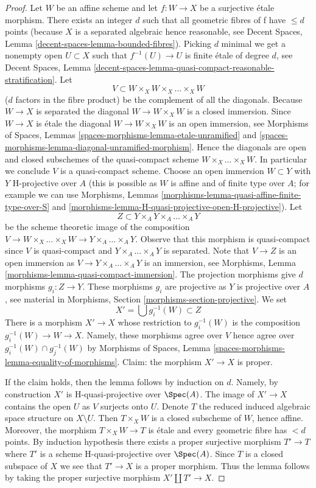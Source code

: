 \begin{proof}
Let $W$ be an affine scheme and let $f : W \to X$ be a surjective
\'etale morphism. There exists an integer $d$ such that all geometric
fibres of f have $\leq d$ points (because $X$ is a separated algebraic
hence reasonable, see
Decent Spaces, Lemma \ref{decent-spaces-lemma-bounded-fibres}).
Picking $d$ minimal we get a nonempty open $U \subset X$ such that
$f^{-1}(U) \to U$ is finite \'etale of degree $d$, see
Decent Spaces, Lemma
\ref{decent-spaces-lemma-quasi-compact-reasonable-stratification}.
Let
$$
V \subset W \times_X W \times_X \ldots \times_X W
$$
($d$ factors in the fibre product) be the complement of all the diagonals.
Because $W \to X$ is separated the diagonal $W \to W \times_X W$ is a
closed immersion. Since $W \to X$ is \'etale the diagonal
$W \to W \times_X W$ is an open immersion, see
Morphisms of Spaces, Lemmas
\ref{spaces-morphisms-lemma-etale-unramified} and
\ref{spaces-morphisms-lemma-diagonal-unramified-morphism}.
Hence the diagonals are open and closed subschemes
of the quasi-compact scheme $W \times_X \ldots \times_X W$.
In particular we conclude $V$ is a quasi-compact scheme.
Choose an open immersion $W \subset Y$ with $Y$ H-projective over
$A$ (this is possible as $W$ is affine and of finite type over $A$;
for example we can use
Morphisms, Lemmas
\ref{morphisms-lemma-quasi-affine-finite-type-over-S} and
\ref{morphisms-lemma-H-quasi-projective-open-H-projective}).
Let
$$
Z \subset Y \times_A Y \times_A \ldots \times_A Y
$$
be the scheme theoretic image of the composition
$V \to W \times_X \ldots \times_X W \to Y \times_A \ldots \times_A Y$.
Observe that this morphism is quasi-compact since $V$ is quasi-compact
and $Y \times_A \ldots \times_A Y$ is separated.
Note that $V \to Z$ is an open immersion as
$V \to Y \times_A \ldots \times_A Y$ is an immersion, see
Morphisms, Lemma \ref{morphisms-lemma-quasi-compact-immersion}.
The projection morphisms give $d$ morphisms $g_i : Z \to Y$.
These morphisms $g_i$ are projective as $Y$ is projective over $A$, see
material in Morphisms, Section \ref{morphisms-section-projective}.
We set
$$
X' = \bigcup g_i^{-1}(W) \subset Z
$$
There is a morphism $X' \to X$ whose restriction to $g_i^{-1}(W)$ is
the composition $g_i^{-1}(W) \to W \to X$.
Namely, these morphisms agree over $V$ hence agree over
$g_i^{-1}(W) \cap g_j^{-1}(W)$ by
Morphisms of Spaces, Lemma \ref{spaces-morphisms-lemma-equality-of-morphisms}.
Claim: the morphism $X' \to X$ is proper.

\medskip\noindent
If the claim holds, then the lemma follows by induction on $d$.
Namely, by construction $X'$ is H-quasi-projective over $\Spec(A)$.
The image of $X' \to X$ contains the open $U$ as $V$ surjects onto $U$.
Denote $T$ the reduced induced algebraic space structure on $X \setminus U$.
Then $T \times_X W$ is a closed subscheme of $W$, hence affine.
Moreover, the morphism $T \times_X W \to T$ is \'etale and every geometric
fibre has $< d$ points. By induction hypothesis there exists a proper
surjective morphism $T' \to T$ where $T'$ is a scheme H-quasi-projective
over $\Spec(A)$. Since $T$ is a closed subspace of $X$ we see that
$T' \to X$ is a proper morphism. Thus the lemma follows by taking the
proper surjective morphism $X' \amalg T' \to X$.


\end{proof}
